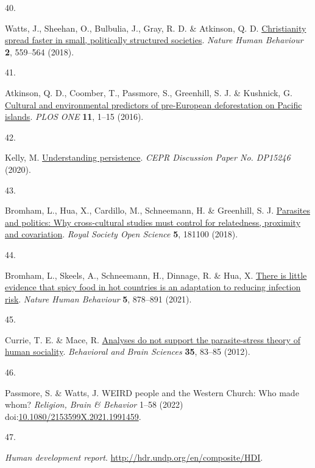 \documentclass[
  man,floatsintext]{apa6}
\newlength{\cslhangindent}
\newlength{\csllabelwidth}
\newlength{\cslentryspacingunit} %
\newenvironment{CSLReferences}[2] %
 {%
  \setlength{\parindent}{0pt}
  \ifodd #1
  \let\oldpar\par
  \def\par{\hangindent=\cslhangindent\oldpar}
  \fi
  \setlength{\parskip}{#2\cslentryspacingunit}
 }%
 {}
\newcommand{\CSLLeftMargin}[1]{\parbox[t]{\csllabelwidth}{#1}}
\newcommand{\CSLRightInline}[1]{\parbox[t]{\linewidth - \csllabelwidth}{#1}\break}
\begin{document}
\begin{CSLReferences}{0}{0}
\leavevmode{}%
\CSLLeftMargin{40. }%
\CSLRightInline{Watts, J., Sheehan, O., Bulbulia, J., Gray, R. D. \& Atkinson, Q. D. \href{https://doi.org/10.1038/s41562-018-0379-3}{Christianity spread faster in small, politically structured societies}. \emph{Nature Human Behaviour} \textbf{2}, 559--564 (2018).}

\leavevmode{}%
\CSLLeftMargin{41. }%
\CSLRightInline{Atkinson, Q. D., Coomber, T., Passmore, S., Greenhill, S. J. \& Kushnick, G. \href{https://doi.org/10.1371/journal.pone.0156340}{Cultural and environmental predictors of pre-{European} deforestation on {Pacific} islands}. \emph{PLOS ONE} \textbf{11}, 1--15 (2016).}

\leavevmode{}%
\CSLLeftMargin{42. }%
\CSLRightInline{Kelly, M. \href{http://ssrn.com/abstract=3688200}{Understanding persistence}. \emph{CEPR Discussion Paper No. DP15246} (2020).}

\leavevmode{}%
\CSLLeftMargin{43. }%
\CSLRightInline{Bromham, L., Hua, X., Cardillo, M., Schneemann, H. \& Greenhill, S. J. \href{https://doi.org/10.1098/rsos.181100}{Parasites and politics: Why cross-cultural studies must control for relatedness, proximity and covariation}. \emph{Royal Society Open Science} \textbf{5}, 181100 (2018).}

\leavevmode{}%
\CSLLeftMargin{44. }%
\CSLRightInline{Bromham, L., Skeels, A., Schneemann, H., Dinnage, R. \& Hua, X. \href{https://doi.org/10.1038/s41562-020-01039-8}{There is little evidence that spicy food in hot countries is an adaptation to reducing infection risk}. \emph{Nature Human Behaviour} \textbf{5}, 878--891 (2021).}

\leavevmode{}%
\CSLLeftMargin{45. }%
\CSLRightInline{Currie, T. E. \& Mace, R. \href{https://doi.org/10.1017/S0140525X11000963}{Analyses do not support the parasite-stress theory of human sociality}. \emph{Behavioral and Brain Sciences} \textbf{35}, 83--85 (2012).}

\leavevmode{}%
\CSLLeftMargin{46. }%
\CSLRightInline{Passmore, S. \& Watts, J. {WEIRD} people and the {W}estern {C}hurch: Who made whom? \emph{Religion, Brain \& Behavior} 1--58 (2022) doi:\href{https://doi.org/10.1080/2153599X.2021.1991459}{10.1080/2153599X.2021.1991459}.}

\leavevmode{}%
\CSLLeftMargin{47. }%
\CSLRightInline{\emph{Human development report}. \url{http://hdr.undp.org/en/composite/HDI}.}


\end{CSLReferences}
\end{document}
